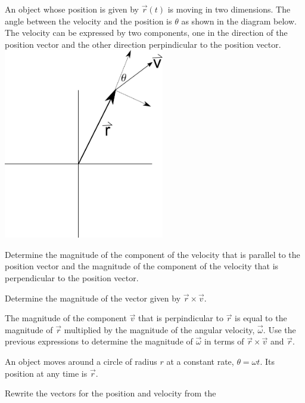 \begin{problem}
\item An object whose position is given by $\vec{r}(t)$ is moving in
  two dimensions. The angle between the velocity and the position is
  $\theta$ as shown in the diagram below. The velocity can be
  expressed by two components, one in the direction of the position
  vector and the other direction
  perpindicular to the position vector. \\
  \includegraphics[width=7cm]{ink/week12/angularComponents}
  \begin{subproblem}
  \item Determine the magnitude of
    the component of the velocity that is parallel to the position
    vector and the magnitude of the component of the velocity that is
    perpendicular to the position vector.  \vfill
  \item Determine the magnitude of the vector given by
    $\vec{r}\times\vec{v}$.
    \vfill
  \item The magnitude of the component $\vec{v}$ that is perpindicular
    to $\vec{r}$ is equal to the magnitude of $\vec{r}$ multiplied by
    the magnitude of the angular velocity, $\vec{\omega}$.  Use the
    previous expressions to determine the magnitude of $\vec{\omega}$
    in terms of $\vec{r}\times\vec{v}$ and $\vec{r}$.  
    \vfill
  \end{subproblem}
  \clearpage
\item An object moves around a circle of radius $r$  at a constant
  rate, $\theta=\omega t$. Its position at any time is $\vec{r}$.
  \begin{subproblem}
  \item Rewrite the vectors for the position and velocity from the

\end{subproblem}
\end{problem}
